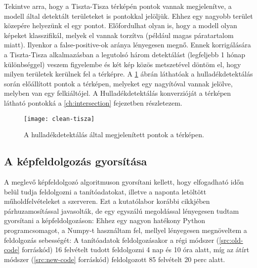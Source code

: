 Tekintve arra, hogy a Tiszta-Tisza térképén pontok vannak megjelenítve, a modell által detektált területeket is pontokkal jelöljük. Ehhez egy nagyobb terület közepére helyezünk el egy pontot. Előfordulhat olyan is, hogy a modell olyan képeket klasszifikál, melyek el vannak torzítva (például magas páratartalom miatt). Ilyenkor a false-positive-ok aránya lényegesen megnő. Ennek korrigálására a Tiszta-Tisza alkalmazásban a legutolsó három detektálást (legfeljebb 1 hónap különbséggel) veszem figyelembe és két kép közös metszetével döntöm el, hogy milyen területek kerülnek fel a térképre. A \ref{fig:clean-tisza} ábrán láthatóak a hulladékdetektálás során előállított pontok a térképen, melyeket egy nagyítóval vannak jelölve, melyben van egy felkiáltójel. A Hulladékdetektálás konverzióját a térképen látható pontokká a \ref{ch:intersection} fejezetben részletezem.

\begin{figure}[H]
	\centering
	\texttt{[image: clean-tisza]}
	\caption{A hulladékdetektálás által megjelenített pontok a térképen.}
    \label{fig:clean-tisza}
\end{figure}

\subsection {A képfeldolgozás gyorsítása}
A meglevő képfeldolgozó algoritmuson gyorsítani kellett, hogy elfogadható időn belül tudja feldolgozni a tanítóadatokat, illetve a naponta letöltött műholdfelvételeket a szerveren. Ezt a kutatólabor korábbi cikkjében párhuzamosítással javasolták, de egy egyszálú megoldással lényegesen tudtam gyorsítani a képfeldolgozáson: Ehhez egy nagyon hatékony Python programcsomagot, a Numpy-t \cite{harris2020array} használtam fel, mellyel lényegesen megnöveltem a feldolgozás sebességét: A tanítóadatok feldolgozásakor a régi módszer (\ref{src:old-code} forráskód) 16 felvételt tudott feldolgozni 4 nap és 10 óra alatt, míg az átírt módszer (\ref{src:new-code} forráskód) feldolgozott 85 felvételt 20 perc alatt.

